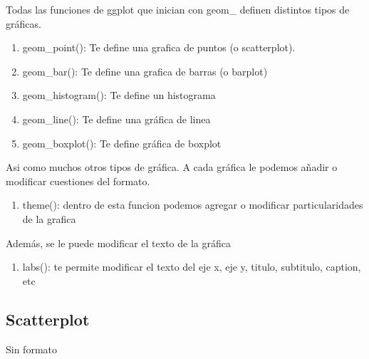 \documentclass[]{book}
\providecommand{\tightlist}{%
  \setlength{\itemsep}{0pt}\setlength{\parskip}{0pt}}
\begin{document}
Todas las funciones de ggplot que inician con geom\_ definen distintos tipos de gráficas.

\begin{enumerate}
\def\labelenumi{\arabic{enumi}.}
\setcounter{enumi}{3}
\tightlist
\item
  geom\_point(): Te define una grafica de puntos (o scatterplot).
\item
  geom\_bar(): Te define una grafica de barras (o barplot)
\item
  geom\_histogram(): Te define un histograma
\item
  geom\_line(): Te define una gráfica de linea
\item
  geom\_boxplot(): Te define gráfica de boxplot
\end{enumerate}

Asi como muchos otros tipos de gráfica. A cada gráfica le podemos añadir o modificar cuestiones del formato.

\begin{enumerate}
\def\labelenumi{\arabic{enumi}.}
\setcounter{enumi}{8}
\tightlist
\item
  theme(): dentro de esta funcion podemos agregar o modificar particularidades de la grafica
\end{enumerate}

Además, se le puede modificar el texto de la gráfica

\begin{enumerate}
\def\labelenumi{\arabic{enumi}.}
\setcounter{enumi}{9}
\tightlist
\item
  labs(): te permite modificar el texto del eje x, eje y, titulo, subtitulo, caption, etc
\end{enumerate}

\hypertarget{scatterplot}{%
\subsection{Scatterplot}\label{scatterplot}}

Sin formato
\end{document}
